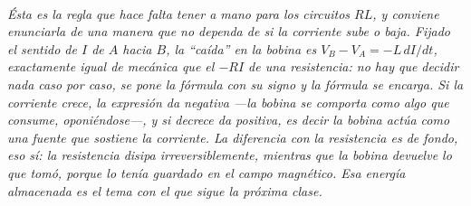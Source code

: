 \begin{center}
\\[0.5em]
{\small\itshape Ésta es la regla que hace falta tener a mano para los circuitos
$RL$, y conviene enunciarla de una manera que no dependa de si la corriente sube
o baja. Fijado el sentido de $I$ de $A$ hacia $B$, la ``caída'' en la bobina es
$V_B - V_A = -L\,dI/dt$, exactamente igual de mecánica que el $-RI$ de una
resistencia: no hay que decidir nada caso por caso, se pone la fórmula con su
signo y la fórmula se encarga. Si la corriente crece, la expresión da negativa
---la bobina se comporta como algo que consume, oponiéndose---, y si decrece da
positiva, es decir la bobina actúa como una fuente que sostiene la corriente. La
diferencia con la resistencia es de fondo, eso sí: la resistencia disipa
irreversiblemente, mientras que la bobina \emph{devuelve} lo que tomó, porque lo
tenía guardado en el campo magnético. Esa energía almacenada es el tema con el
que sigue la próxima clase.}
\end{center}
